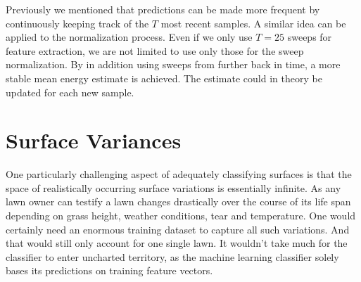 Previously we mentioned that predictions can be made more frequent by continuously keeping track of the $T$ most recent samples. A similar idea can be applied to the normalization process. Even if we only use $T=25$ sweeps for feature extraction, we are not limited to use only those for the sweep normalization. By in addition using sweeps from further back in time, a more stable mean energy estimate is achieved. The estimate could in theory be updated for each new sample.





\section{Surface Variances}

One particularly challenging aspect of adequately classifying surfaces is that the space of realistically occurring surface variations is essentially infinite. As any lawn owner can testify a lawn changes drastically over the course of its life span depending on grass height, weather conditions, tear and temperature. One would certainly need an enormous training dataset to capture all such variations. And that would still only account for one single lawn. It wouldn't take much for the classifier to enter uncharted territory, as the machine learning classifier solely bases its predictions on training feature vectors.

